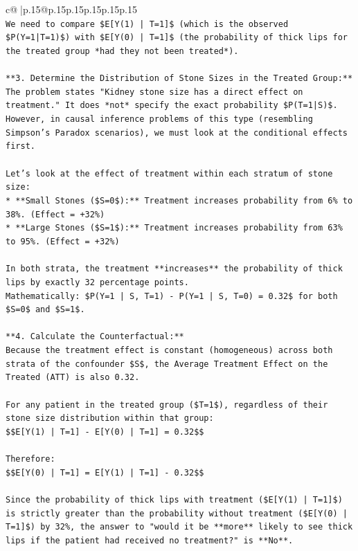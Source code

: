 \documentclass{article}
\begin{document}
{\begin{supertabular}{c@{$\;$}|p{.15\linewidth}@{}p{.15\linewidth}p{.15\linewidth}p{.15\linewidth}p{.15\linewidth}p{.15\linewidth}}
{{{\\ 
\texttt{We need to compare \$E{[}Y(1) | T=1{]}\$ (which is the observed \$P(Y=1|T=1)\$) with \$E{[}Y(0) | T=1{]}\$ (the probability of thick lips for the treated group *had they not been treated*).} \\
\\ 
\texttt{**3. Determine the Distribution of Stone Sizes in the Treated Group:**} \\
\texttt{The problem states "Kidney stone size has a direct effect on treatment." It does *not* specify the exact probability \$P(T=1|S)\$. However, in causal inference problems of this type (resembling Simpson's Paradox scenarios), we must look at the conditional effects first.} \\
\\ 
\texttt{Let's look at the effect of treatment within each stratum of stone size:} \\
\texttt{*   **Small Stones (\$S=0\$):** Treatment increases probability from 6\% to 38\%. (Effect = +32\%)} \\
\texttt{*   **Large Stones (\$S=1\$):** Treatment increases probability from 63\% to 95\%. (Effect = +32\%)} \\
\\ 
\texttt{In both strata, the treatment **increases** the probability of thick lips by exactly 32 percentage points.} \\
\texttt{Mathematically: \$P(Y=1 | S, T=1) {-} P(Y=1 | S, T=0) = 0.32\$ for both \$S=0\$ and \$S=1\$.} \\
\\ 
\texttt{**4. Calculate the Counterfactual:**} \\
\texttt{Because the treatment effect is constant (homogeneous) across both strata of the confounder \$S\$, the Average Treatment Effect on the Treated (ATT) is also 0.32.} \\
\\ 
\texttt{For any patient in the treated group (\$T=1\$), regardless of their stone size distribution within that group:} \\
\texttt{\$\$E{[}Y(1) | T=1{]} {-} E{[}Y(0) | T=1{]} = 0.32\$\$} \\
\\ 
\texttt{Therefore:} \\
\texttt{\$\$E{[}Y(0) | T=1{]} = E{[}Y(1) | T=1{]} {-} 0.32\$\$} \\
\\ 
\texttt{Since the probability of thick lips with treatment (\$E{[}Y(1) | T=1{]}\$) is strictly greater than the probability without treatment (\$E{[}Y(0) | T=1{]}\$) by 32\%, the answer to "would it be **more** likely to see thick lips if the patient had received no treatment?" is **No**.} \\
}}}
\end{supertabular}}
\end{document}

